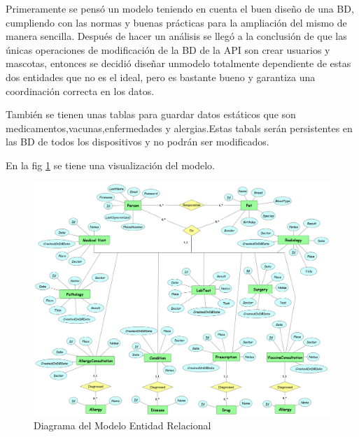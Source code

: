 Primeramente se pensó un modelo teniendo en cuenta el buen diseño de una BD, cumpliendo con las normas y buenas prácticas para la ampliación del mismo de manera sencilla. Después de hacer un análisis se llegó a la conclusión de que las únicas operaciones de modificación de la BD de la API son crear  usuarios y mascotas, entonces se decidió diseñar unmodelo totalmente dependiente de estas dos entidades que no es el ideal, pero es bastante bueno y garantiza una coordinación correcta en los datos. 

También se tienen unas tablas para guardar datos estáticos que son medicamentos,vacunas,enfermedades y alergias.Estas tabals serán persistentes en las BD de todos los dispositivos y no podrán ser modificados. 

En la fig \ref{fig:model} se tiene una visualización del modelo.

\begin{figure}
	\centering
	\includegraphics[width = 15cm]{MainMatter/model.png}
	\caption{Diagrama del Modelo Entidad Relacional }
	\label{fig:model}
	
\end{figure}	


  

